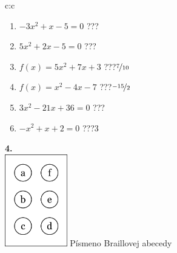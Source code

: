 \documentclass[10pt]{report}
\begin{document}
\begin{tabular}{c:c}
\begin{minipage}[c][104.5mm][t]{0.5\linewidth}
\begin{center}
\begin{minipage}{0.79\linewidth}
\begin{center}
\begin{varwidth}{\linewidth}
\begin{enumerate}
\Large
\item $-3x^2+x-5=0$\quad \dotfill\; ???\;\dotfill {}
\item $5x^2+2x-5=0$\quad \dotfill\; ???\;\dotfill {}
\item $f(x)=5x^2+7x+3$\quad \dotfill\; ???\;\dotfill \quad $\nicefrac{7}{10}$
\item $f(x)=x^2-4x-7$\quad \dotfill\; ???\;\dotfill \quad $\nicefrac{-15}{2}$
\item $3x^2-21x+36=0$\quad \dotfill\; ???\;\dotfill {}
\item $-x^2+x+2=0$\quad \dotfill\; ???\;\dotfill \quad $3$
\end{enumerate}
\end{varwidth}
\end{center}
\end{minipage}
\begin{minipage}{0.20\linewidth}
\begin{center}
{\Huge\bfseries 4.} \\[2mm]
\includegraphics[height=40mm]{../images/braille.png}
{\small Písmeno Braillovej abecedy}
\end{center}
\end{minipage}
\end{center}
\end{minipage}
%
\end{tabular}
\newpage
\thispagestyle{empty}
\end{document}
